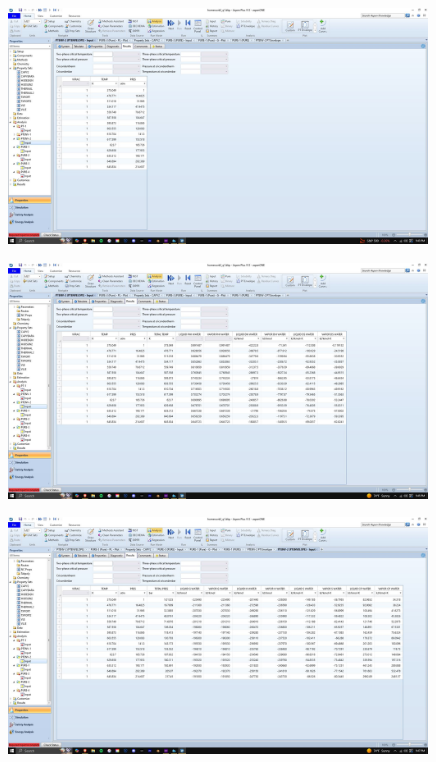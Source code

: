 \documentclass{article}
\begin{document}
\begin{figure}[H]
    \centering
    \includegraphics[width=0.99\textwidth, frame]{img/13 (envelope table).JPG}
\end{figure}

\begin{figure}[H]
    \centering
    \includegraphics[width=0.99\textwidth, frame]{img/14 (pl + propset).JPG}
\end{figure}

\begin{figure}[H]
    \centering
    \includegraphics[width=0.99\textwidth, frame]{img/15 (pl + propset2).JPG}
\end{figure}
\end{document}
